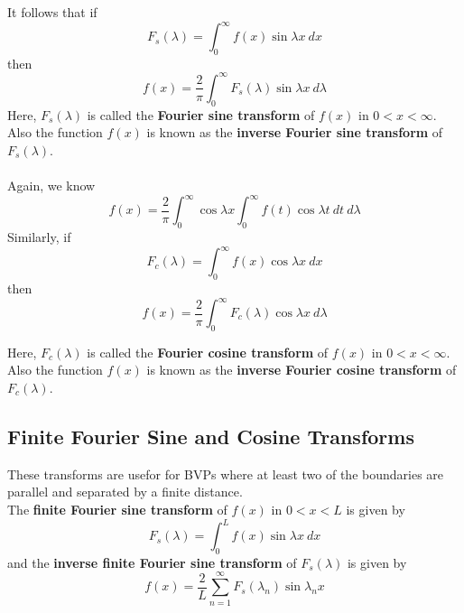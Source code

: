 \documentclass[12pt]{article}
\numberwithin{equation}{subsection}
\begin{document}
It follows that if
\begin{equation}
    F_s(\lambda) = \int_{0}^{\infty} { f(x) \sin{\lambda x} } \: d{x}
\end{equation}
then
\begin{equation}
    f(x) = \frac{2}{\pi} \int_{0}^{\infty} { F_s(\lambda) \sin{\lambda x} } \: d{\lambda} 
\end{equation}
Here, $F_s(\lambda)$ is called the \textbf{Fourier sine transform} of $f(x)$ in $0<x<\infty$. Also the function $f(x)$ is known as the \textbf{inverse Fourier sine transform} of $F_s(\lambda)$.\\~\\

Again, we know
\begin{equation}
    f(x) = \frac{2}{\pi} \int_{0}^{\infty} { \cos{\lambda x} \int_{0}^{\infty} { f(t) \cos{\lambda t} } \: d{t} } \: d{\lambda}
\end{equation}
Similarly, if
\begin{equation}
    F_c(\lambda) = \int_{0}^{\infty} { f(x) \cos{\lambda x} } \: d{x}
\end{equation}
then
\begin{equation}
    f(x) = \frac{2}{\pi} \int_{0}^{\infty} { F_c(\lambda) \cos{\lambda x} } \: d{\lambda}
\end{equation}

Here, $F_c(\lambda)$ is called the \textbf{Fourier cosine transform} of $f(x)$ in $0<x<\infty$. Also the function $f(x)$ is known as the \textbf{inverse Fourier cosine transform} of $F_c(\lambda)$.

\subsection{Finite Fourier Sine and Cosine Transforms}
These transforms are usefor for BVPs where at least two of the boundaries are parallel and separated by a finite distance.\\

The \textbf{finite Fourier sine transform} of $f(x)$ in $0<x<L$ is given by
\begin{equation}
    \boxed{ F_s(\lambda) = \int_{0}^{L} { f(x) \sin{\lambda x} } \: d{x} }
\end{equation}
and the \textbf{inverse finite Fourier sine transform} of $F_s(\lambda)$ is given by
\begin{equation}
    \boxed{ f(x) = \frac{2}{L} \sum_{n=1}^{\infty} { F_s(\lambda_n) \sin{\lambda_n x} } }
\end{equation}
\end{document}
